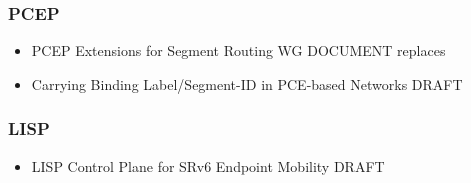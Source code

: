 {\subsubsection{PCEP}
\begin{itemize}
    \item PCEP Extensions for Segment Routing WG DOCUMENT \cite{ietf-pce-segment-routing} replaces \cite{sivabalan-pce-segment-routing-03}
    \item Carrying Binding Label/Segment-ID in PCE-based Networks DRAFT \cite{sivabalan-pce-binding-label-sid-04}
\end{itemize}    
\subsubsection{LISP}
\begin{itemize}
    \item LISP Control Plane for SRv6 Endpoint Mobility DRAFT \cite{rodrigueznatal-lisp-srv6-00}
\end{itemize}} 